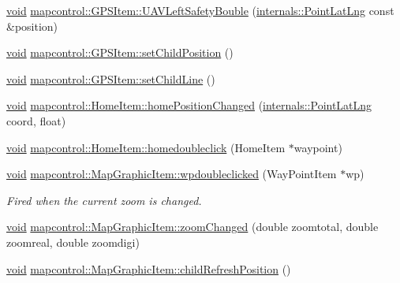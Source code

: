 \begin{DoxyCompactItemize}
\item 
\hyperlink{group___u_a_v_objects_plugin_ga444cf2ff3f0ecbe028adce838d373f5c}{void} \hyperlink{group___o_p_map_widget_ga1ff02a44dc75d4a1e4b596c525cdd01c}{mapcontrol\-::\-G\-P\-S\-Item\-::\-U\-A\-V\-Left\-Safety\-Bouble} (\hyperlink{structinternals_1_1_point_lat_lng}{internals\-::\-Point\-Lat\-Lng} const \&position)
\item 
\hyperlink{group___u_a_v_objects_plugin_ga444cf2ff3f0ecbe028adce838d373f5c}{void} \hyperlink{group___o_p_map_widget_ga049682502601e7325ec7d23d8a01bf5c}{mapcontrol\-::\-G\-P\-S\-Item\-::set\-Child\-Position} ()
\item 
\hyperlink{group___u_a_v_objects_plugin_ga444cf2ff3f0ecbe028adce838d373f5c}{void} \hyperlink{group___o_p_map_widget_gab1b84f9c892548a9994f0e69cc0be466}{mapcontrol\-::\-G\-P\-S\-Item\-::set\-Child\-Line} ()
\item 
\hyperlink{group___u_a_v_objects_plugin_ga444cf2ff3f0ecbe028adce838d373f5c}{void} \hyperlink{group___o_p_map_widget_ga0e1509f9592dd23581de347130ed8d85}{mapcontrol\-::\-Home\-Item\-::home\-Position\-Changed} (\hyperlink{structinternals_1_1_point_lat_lng}{internals\-::\-Point\-Lat\-Lng} coord, float)
\item 
\hyperlink{group___u_a_v_objects_plugin_ga444cf2ff3f0ecbe028adce838d373f5c}{void} \hyperlink{group___o_p_map_widget_ga7d84c3892299fbfa670e98cca3cb871d}{mapcontrol\-::\-Home\-Item\-::homedoubleclick} (\-Home\-Item $\ast$waypoint)
\item 
\hyperlink{group___u_a_v_objects_plugin_ga444cf2ff3f0ecbe028adce838d373f5c}{void} \hyperlink{group___o_p_map_widget_ga795f053b52b5fe955eee059db5cb0afd}{mapcontrol\-::\-Map\-Graphic\-Item\-::wpdoubleclicked} (\-Way\-Point\-Item $\ast$wp)
\begin{DoxyCompactList}\small\item\em \-Fired when the current zoom is changed. \end{DoxyCompactList}\item 
\hyperlink{group___u_a_v_objects_plugin_ga444cf2ff3f0ecbe028adce838d373f5c}{void} \hyperlink{group___o_p_map_widget_ga7022afbf8533ece279e5b06dcbe66935}{mapcontrol\-::\-Map\-Graphic\-Item\-::zoom\-Changed} (double zoomtotal, double zoomreal, double zoomdigi)
\item 
\hyperlink{group___u_a_v_objects_plugin_ga444cf2ff3f0ecbe028adce838d373f5c}{void} \hyperlink{group___o_p_map_widget_ga4877137ff20f1713d86737fcde3e5eef}{mapcontrol\-::\-Map\-Graphic\-Item\-::child\-Refresh\-Position} ()
\item 

\end{DoxyCompactItemize}

